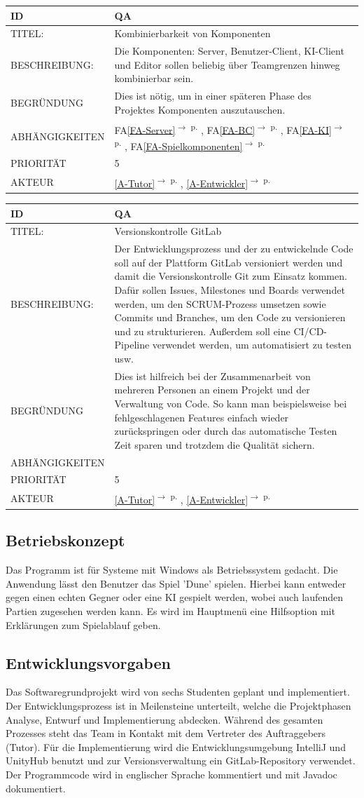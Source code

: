 \documentclass[12pt]{article}
\newcounter{fa}
\newcounter{nfa}
\newcommand{\nfa}[7]{
\refstepcounter{nfa}\label{#7}
\begin{tabularx}{16cm}{l|X}
\textbf{ID} & \textbf{QA\arabic{nfa}} \\
\hline
TITEL: & #1 \\
\hline
BESCHREIBUNG: & #2 \\
\hline
BEGRÜNDUNG & #3 \\ 
\hline
ABHÄNGIGKEITEN & #4\\ 
\hline 
PRIORITÄT & #5\\ 
\hline 
AKTEUR & #6
\end{tabularx}
\vspace*{0.75cm}
}
\newcommand{\rref}[1]{\ref{#1}\textsuperscript{$\rightarrow$ p. \pageref{#1}}}
\newcommand{\faref}[1]{FA\ref{#1}\textsuperscript{$\rightarrow$ p. \pageref{#1}}}
\begin{document}
\nfa{Kombinierbarkeit von Komponenten}{Die Komponenten: Server, Benutzer-Client, KI-Client und Editor sollen beliebig über Teamgrenzen hinweg kombinierbar sein.}{Dies ist nötig, um in einer späteren Phase des Projektes Komponenten auszutauschen.}{\faref{FA-Server}, \faref{FA-BC}, \faref{FA-KI},  \faref{FA-Spielkomponenten}}{5}{\rref{A-Tutor}, \rref{A-Entwickler}}{FA-Kombinierbarkeit-Komponenten}

\nfa{Versionskontrolle GitLab}{Der Entwicklungsprozess und der zu entwickelnde Code soll auf der Plattform GitLab versioniert werden und damit die Versionskontrolle Git zum Einsatz kommen. Dafür sollen Issues, Milestones und Boards verwendet werden, um den SCRUM-Prozess umsetzen sowie Commits und Branches, um den Code zu versionieren und zu strukturieren. Außerdem soll eine CI/CD-Pipeline verwendet werden, um automatisiert zu testen usw.}{Dies ist hilfreich bei der Zusammenarbeit von mehreren Personen an einem Projekt und der Verwaltung von Code. So kann man beispielsweise bei fehlgeschlagenen Features einfach wieder zurückspringen oder durch das automatische Testen Zeit sparen und trotzdem die Qualität sichern.}{}{5}{\rref{A-Tutor}, \rref{A-Entwickler}}{QA-Versionskontrolle}

\newpage

\flushleft

\subsection{Betriebskonzept}

Das Programm ist für Systeme mit Windows als Betriebssystem gedacht. Die Anwendung lässt den Benutzer das Spiel 'Dune' spielen. Hierbei kann entweder gegen einen echten Gegner oder eine KI gespielt werden, wobei auch laufenden Partien zugesehen werden kann. Es wird im Hauptmenü eine Hilfsoption mit Erklärungen zum Spielablauf geben.

\subsection{Entwicklungsvorgaben}

Das Softwaregrundprojekt wird von sechs Studenten geplant und implementiert. Der Entwicklungsprozess ist in Meilensteine unterteilt, welche die Projektphasen Analyse, Entwurf und Implementierung abdecken. Während des gesamten Prozesses steht das Team in Kontakt mit dem Vertreter des Auftraggebers (Tutor). Für die Implementierung wird die Entwicklungsumgebung IntelliJ und UnityHub benutzt und zur Versionsverwaltung ein GitLab-Repository verwendet. Der Programmcode wird in englischer Sprache kommentiert und mit Javadoc dokumentiert.
\end{document}
